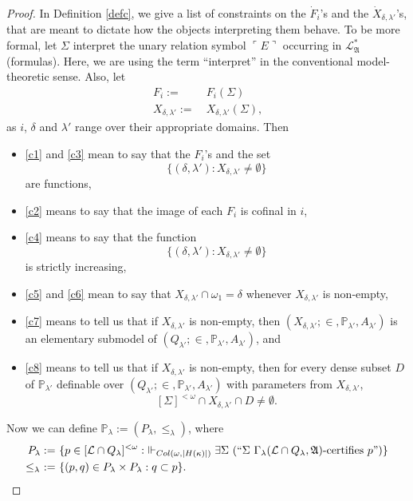 \documentclass[12pt]{article}
\numberwithin{equation}{section}
\begin{document}
\begin{proof}
In Definition \ref{defc}, we give a list of constraints on the $\dot{F}_i$'s and the $\dot{X}_{\delta, \lambda'}$'s, that are meant to dictate how the objects interpreting them behave. To be more formal, let $\Sigma$ interpret the unary relation symbol $\ulcorner E \urcorner$ occurring in $\mathcal{L}^*_{\mathfrak{A}}$ (formulas). Here, we are using the term ``interpret'' in the conventional model-theoretic sense. Also, let
\begin{align*}
    F_i := \ & F_i(\Sigma) \\
    X_{\delta, \lambda'} := \ & X_{\delta, \lambda'}(\Sigma) \text{,}
\end{align*}
as $i$, $\delta$ and $\lambda'$ range over their appropriate domains. Then
\begin{itemize}
    \item \ref{c1} and \ref{c3} mean to say that the $F_i$'s and the set $$\{(\delta, \lambda') : X_{\delta, \lambda'} \neq \emptyset\}$$ are functions,
    \item \ref{c2} means to say that the image of each $F_i$ is cofinal in $i$,
    \item \ref{c4} means to say that the function $$\{(\delta, \lambda') : X_{\delta, \lambda'} \neq \emptyset\}$$ is strictly increasing,
    \item \ref{c5} and \ref{c6} mean to say that $X_{\delta, \lambda'} \cap \omega_1 = \delta$ whenever $X_{\delta, \lambda'}$ is non-empty,
    \item \ref{c7} means to tell us that if $X_{\delta, \lambda'}$ is non-empty, then $(X_{\delta, \lambda'}; \in,  \mathbb{P}_{\lambda'}, A_{\lambda'})$ is an elementary submodel of $(Q_{\lambda'}; \in,  \mathbb{P}_{\lambda'}, A_{\lambda'})$, and
    \item \ref{c8} means to tell us that if $X_{\delta, \lambda'}$ is non-empty, then for every dense subset $D$ of $\mathbb{P}_{\lambda'}$ definable over $(Q_{\lambda'}; \in, \mathbb{P}_{\lambda'}, A_{\lambda'})$ with parameters from $X_{\delta, \lambda'}$, $$[\Sigma]^{< \omega} \cap X_{\delta, \lambda'} \cap D \neq \emptyset.$$ 
\end{itemize}

Now we can define $\mathbb{P}_{\lambda} := (P_{\lambda}, \leq_{\lambda})$, where
\begin{align*}
    P_{\lambda} := \ & \{p \in [\mathcal{L} \cap Q_{\lambda}]^{< \omega} : \ \Vdash_{Col(\omega, |H(\kappa)|)} \exists \Sigma \ (``\Sigma \ \Gamma_{\lambda} (\mathcal{L} \cap Q_{\lambda}, \mathfrak{A}) \text{-certifies } p")\} \\
    \leq_{\lambda} \ := \ & \{(p, q) \in P_{\lambda} \times P_{\lambda} : q \subset p\}.
\end{align*}


\end{proof}
\end{document}

